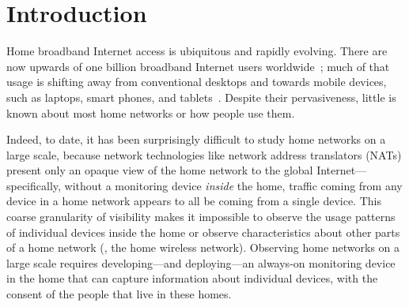 \section{Introduction}

Home broadband Internet access is ubiquitous and rapidly evolving. There
are now upwards of one billion broadband Internet users
worldwide~\cite{www-internet-stats}; much of that usage is shifting away
from conventional desktops and towards mobile devices, such as laptops,
smart phones, and tablets~\cite{www-itu}.  Despite their pervasiveness,
little is known about most home networks or how people use them.

Indeed, to date, it has been surprisingly difficult to study home networks on
a large scale, because network technologies like network
address translators (NATs) present only an opaque view of the home
network to the global Internet---specifically, without a monitoring
device {\em inside} the home, traffic coming from any device in a
home network appears to all be coming from a single device.  This coarse
granularity of visibility makes it impossible to observe the usage
patterns of individual devices inside the home or observe
characteristics about other parts of a home network (\eg, the home
wireless network).  Observing home networks on a large scale requires
developing---and deploying---an always-on monitoring device in the home
that can capture information about individual devices, with the consent of
the people that live in these homes.

